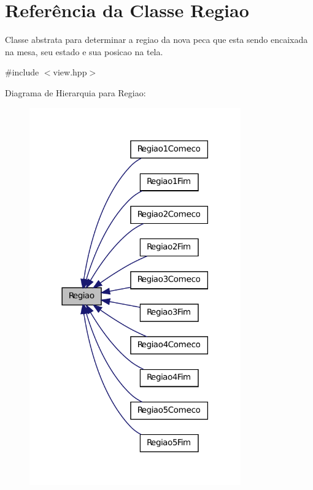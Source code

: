 \hypertarget{classRegiao}{
\section{Referência da Classe Regiao}
\label{classRegiao}
}


Classe abstrata para determinar a regiao da nova peca que esta sendo encaixada na mesa, seu estado e sua posicao na tela.  




{\ttfamily \#include $<$view.hpp$>$}



Diagrama de Hierarquia para Regiao:\nopagebreak
\begin{figure}[H]
\begin{center}
\leavevmode
\includegraphics[width=258pt]{classRegiao__inherit__graph}
\end{center}
\end{figure}

